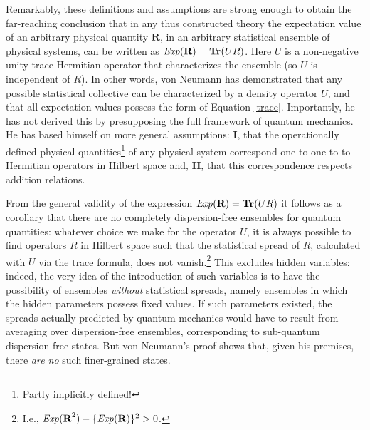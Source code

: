 \documentclass[12pt]{article}
\begin{document}
Remarkably, these definitions and assumptions are strong enough to obtain \cite[pp.\@ 167--168]{VN1} the far-reaching conclusion that in any thus constructed theory the expectation value of an arbitrary physical quantity $\textbf{R}$, in an arbitrary statistical ensemble of physical systems, can be written as ${\it Exp}(\textbf{R}) = \textbf{Tr}(UR)$. Here $U$ is a non-negative unity-trace Hermitian operator that characterizes the ensemble (so $U$ is independent of $R$). In other words, von Neumann has demonstrated that any possible statistical collective can be characterized by a density operator $U$, and that all expectation values possess the form of Equation \ref{trace}. Importantly, he has not derived this by presupposing the full framework of quantum mechanics. He has based himself on more general assumptions: \textbf{I}, that the operationally defined physical quantities\footnote{Partly implicitly defined!} of any physical system correspond one-to-one to to Hermitian operators in Hilbert space and, \textbf{II}, that this correspondence respects addition relations.

From the general validity of the expression ${\it Exp}(\textbf{R}) = \textbf{Tr}(UR)$ it follows as a corollary that there are no completely dispersion-free ensembles for quantum quantities: whatever choice we make for the operator $U$, it is always possible to find operators $R$ in Hilbert space such that the statistical spread of $R$, calculated with $U$ via the trace formula, does not vanish.\footnote{I.e., ${\it Exp}(\textbf{R}^2) - \{{\it Exp}(\textbf{R})\}^2 > 0$.} This excludes hidden variables: indeed, the very idea of the introduction of such variables is to have the possibility of ensembles \emph{without} statistical spreads, namely ensembles in which the hidden parameters possess fixed values. If such parameters existed, the spreads actually predicted by quantum mechanics would have to result from averaging over dispersion-free ensembles, corresponding to sub-quantum dispersion-free states. But von Neumann's proof shows that, given his premises, there \emph{are no} such finer-grained states.
\end{document}
